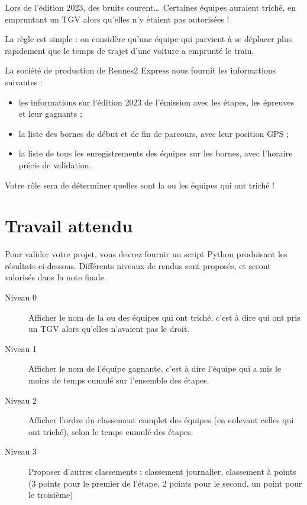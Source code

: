 \documentclass[11pt,a4paper]{article}
\begin{document}
\vspace{2em}
Lors de l'édition 2023, des bruits courent\dots ~Certaines équipes auraient triché, en empruntant un TGV alors qu'elles n'y étaient pas autorisées !

La règle est simple : on considère qu'une équipe qui parvient à se déplacer plus rapidement que le temps de trajet d'une voiture a emprunté le train.

La société de production de Rennes2 Express nous fournit les informations suivantes : 
\begin{itemize}
    \item les informations sur l'édition 2023 de l'émission avec les étapes, les épreuves et leur gagnants ;
    \item la liste des bornes de début et de fin de parcours, avec leur position GPS ;
    \item la liste de tous les enregistrements des équipes sur les bornes, avec l'horaire précis de validation.
\end{itemize}


Votre rôle sera de déterminer quelles sont la ou les équipes qui ont triché !

\section{Travail attendu}

Pour valider votre projet, vous devrez fournir un script Python produisant les résultats ci-dessous.
 Différents niveaux de rendus sont proposés, et seront valorisés dans la note finale. 

\begin{description}
    \item[Niveau 0] Afficher le nom de la ou des équipes qui ont triché, c'est à dire qui ont pris un TGV alors qu'elles n'avaient pas le droit. 
    \item[Niveau 1] Afficher le nom de l'équipe gagnante, c'est à dire l'équipe qui a mis le moins de temps cumulé sur l'ensemble des étapes. 
    \item[Niveau 2] Afficher l'ordre du classement complet des équipes (en enlevant celles qui ont triché), selon le temps cumulé des étapes.
    \item[Niveau 3] Proposer d'autres classements : classement journalier, classement à points (3 points pour le premier de l'étape, 2 points pour le second, un point pour le troisième)

\end{description}
\end{document}
